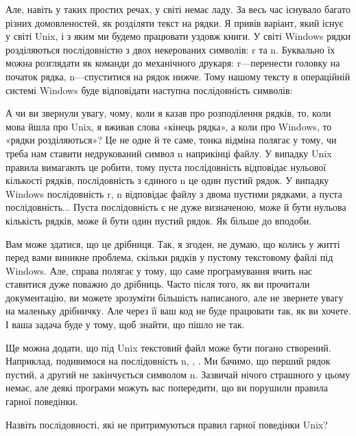 Але, навіть у таких простих речах, у світі немає ладу.
За весь час існувало багато різних домовленостей, як розділяти текст на рядки.
Я привів варіант, який існує у світі Unix, і з яким ми будемо працювати уздовж книги.
У світі Windows рядки розділяються послідовністю з двох некерованих символів: \chesc r та \chesc n.
Буквально їх можна розглядати як команди до механічного друкаря: \chesc r---перенести головку на початок рядка, \chesc n---спуститися на рядок нижче.
Тому нашому тексту в операційній системі Windows буде відповідати наступна послідовність символів:

А чи ви звернули увагу, чому, коли я казав про розподілення рядків, то, коли мова йшла про Unix, я вживав слова «кінець рядка», а коли про Windows, то «рядки розділяються»?
Це не одне й те саме, тонка відміна полягає у тому, чи треба нам ставити недрукований символ \chesc n наприкінці файлу.
У випадку Unix правила вимагають це робити, тому пуста послідовність відповідає нульової кількості рядків, послідовність з єдиного \chesc n це один пустий рядок.
У випадку Windows послідовність \chesc r, \chesc n відповідає файлу з двома пустими рядками, а пуста послідовність...
Пуста послідовність є не дуже визначеною, може й бути нульова кількість рядків, може й бути один пустий рядок.
Як більше до вподоби.

Вам може здатися, що це дрібниця.
Так, я згоден, не думаю, що колись у житті перед вами виникне проблема, скільки рядків у пустому текстовому файлі під Windows.
Але, справа полягає у тому, що саме програмування вчить нас ставитися дуже поважно до дрібниць.
Часто після того, як ви прочитали документацію, ви можете зрозуміти більшість написаного, але не звернете увагу на маленьку дрібничку.
Але через її ваш код не буде працювати так, як ви хочете.
І ваша задача буде у тому, щоб знайти, що пішло не так.

Ще можна додати, що під Unix текстовий файл може бути погано створений.
Наприклад, подивимося на послідовність \chesc n, , .
Ми бачимо, що перший рядок пустий, а другий не закінчується символом \chesc n.
Зазвичай нічого страшного у цьому немає, але деякі програми можуть вас попередити, що ви порушили правила гарної поведінки.

\begin{exercise}
Назвіть послідовності, які не притримуються правил гарної поведінки Unix?

\end{exercise}

